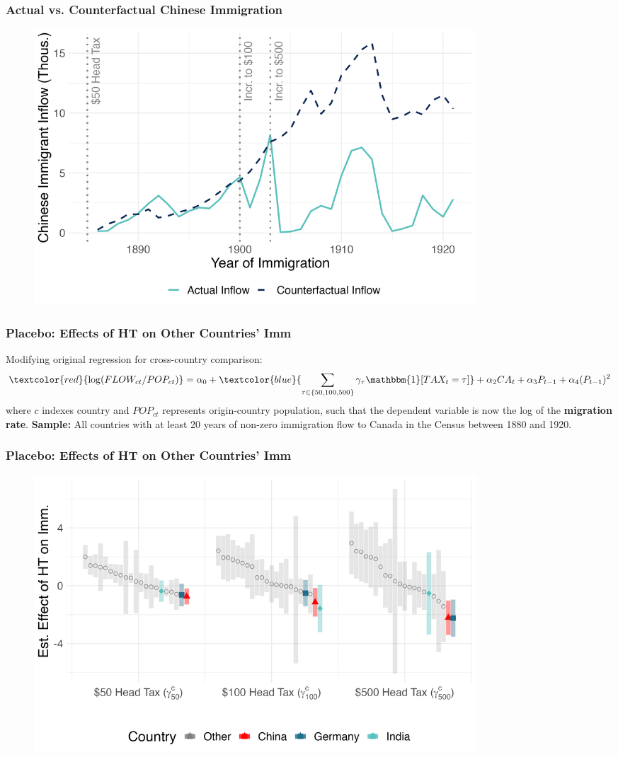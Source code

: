 \documentclass[xcolor=dvipsnames, compress, 12pt, aspectratio=169, handout]{beamer}
\begin{document}
\begin{frame}
    \label{flow_cf}
    \frametitle{Actual vs. Counterfactual Chinese Immigration \hyperlink{reg_flow}{}}
    \centering
    \begin{figure}
        \includegraphics[width = 0.8\textwidth]{../../figs/slides/immflow_counterfactual.png}
    \end{figure}
\end{frame}

\begin{frame}
    \label{flow_placebo1}
    \frametitle{Placebo: Effects of HT on Other Countries' Imm \hyperlink{reg_flow}{}}
    Modifying original regression for cross-country comparison:
    \begin{equation*}
        \textcolor{red}{\log(FLOW_{ct}/POP_{ct})} = \alpha_0 + \textcolor{blue}{\sum_{\tau \in \{50, 100, 500\}} \gamma_{\tau} \mathbbm{1}[TAX_t = \tau]} + \alpha_2 CA_t + \alpha_3 P_{t-1} + \alpha_4(P_{t-1})^2
    \end{equation*}
    where $c$ indexes country and $POP_{ct}$ represents origin-country population, such that the dependent variable is now the log of the \textbf{migration rate}.
    \vspace{2mm}
    \textbf{Sample:} All countries with at least 20 years of non-zero immigration flow to Canada in the Census between 1880 and 1920.
\end{frame}

\begin{frame}
    \label{flow_placebo2}
    \frametitle{Placebo: Effects of HT on Other Countries' Imm \hyperlink{reg_flow}{}}
    \centering
    \begin{figure}
        \includegraphics[width = 0.8\textwidth]{../../figs/slides/immflow_countries.png}
    \end{figure}
\end{frame}
\end{document}

